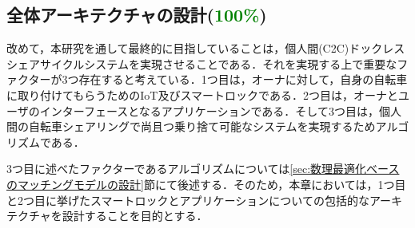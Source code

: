   \subsection{全体アーキテクチャの設計(\textcolor{green}{100\%})}
    \label{sec:全体アーキテクチャの設計}
      \par 改めて，本研究を通して最終的に目指していることは，個人間(C2C)ドックレスシェアサイクルシステムを実現させることである．それを実現する上で重要なファクターが3つ存在すると考えている．1つ目は，オーナに対して，自身の自転車に取り付けてもらうためのIoT及びスマートロックである．2つ目は，オーナとユーザのインターフェースとなるアプリケーションである．そして3つ目は，個人間の自転車シェアリングで尚且つ乗り捨て可能なシステムを実現するためアルゴリズムである．
      \par 3つ目に述べたファクターであるアルゴリズムについては\ref{sec:数理最適化ベースのマッチングモデルの設計}節にて後述する．そのため，本章においては，1つ目と2つ目に挙げたスマートロックとアプリケーションについての包括的なアーキテクチャを設計することを目的とする．

